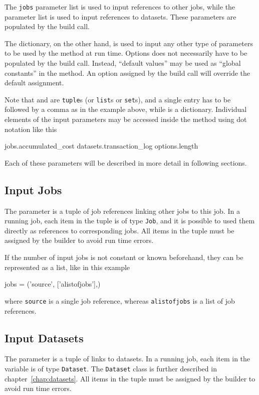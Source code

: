 The \texttt{jobs} parameter list is used to input references to other
jobs, while the \datasets parameter list is used to input references
to datasets.  These parameters are populated by the build call.

The \options dictionary, on the other hand, is used to input any other
type of parameters to be used by the method at run time.  Options does
not necessarily have to be populated by the build call.  Instead,
``default values'' may be used as ``global constants'' in the method.
An option assigned by the build call will override the default
assignment.

Note that \jobs and \datasets are \texttt{tuple}s (or \texttt{list}s
or \texttt{set}s), and a single entry has to be followed by a comma as
in the example above, while \options is a dictionary.  Individual
elements of the input parameters may be accessed inside the method
using dot notation like this
\begin{python}
jobs.accumulated_cost
datasets.transaction_log
options.length
\end{python}
Each of these parameters will be described in more detail in following
sections.


\subsection{Input Jobs}
The \jobs parameter is a tuple of job references linking other jobs to
this job.  In a running job, each item in the \jobs tuple is of
type \texttt{Job}, and it is possible to used them directly as
references to corresponding jobs.  All items in the \jobs tuple must
be assigned by the builder to avoid run time errors.

If the number of input jobs is not constant or known beforehand, they
can be represented as a list, like in this example
\begin{python}
jobs = ('source', ['alistofjobs'],)
\end{python}
where \texttt{source} is a single job reference, whereas
\texttt{alistofjobs} is a list of job references.


\subsection{Input Datasets}
The \datasets parameter is a tuple of links to datasets.  In a running
job, each item in the \datasets variable is of type
\texttt{Dataset}.  The \texttt{Dataset} class is further described in
chapter~\ref{chap:datasets}.  All items in the \datasets tuple must be
assigned by the builder to avoid run time errors.

